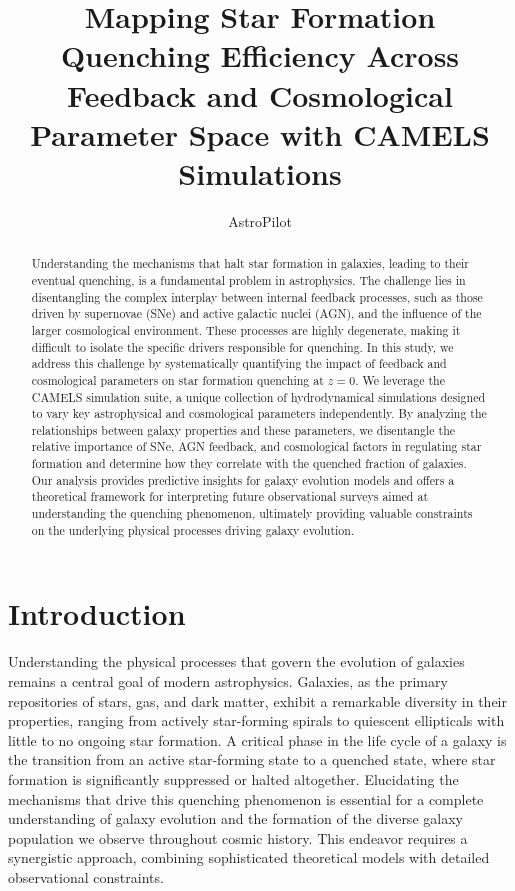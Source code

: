 \documentclass[twocolumn]{aastex631}
\begin{document}
\title{Mapping Star Formation Quenching Efficiency Across Feedback and Cosmological Parameter Space with CAMELS Simulations}

\author{AstroPilot}

\begin{abstract}
Understanding the mechanisms that halt star formation in galaxies, leading to their eventual quenching, is a fundamental problem in astrophysics. The challenge lies in disentangling the complex interplay between internal feedback processes, such as those driven by supernovae (SNe) and active galactic nuclei (AGN), and the influence of the larger cosmological environment. These processes are highly degenerate, making it difficult to isolate the specific drivers responsible for quenching. In this study, we address this challenge by systematically quantifying the impact of feedback and cosmological parameters on star formation quenching at $z=0$. We leverage the CAMELS simulation suite, a unique collection of hydrodynamical simulations designed to vary key astrophysical and cosmological parameters independently. By analyzing the relationships between galaxy properties and these parameters, we disentangle the relative importance of SNe, AGN feedback, and cosmological factors in regulating star formation and determine how they correlate with the quenched fraction of galaxies. Our analysis provides predictive insights for galaxy evolution models and offers a theoretical framework for interpreting future observational surveys aimed at understanding the quenching phenomenon, ultimately providing valuable constraints on the underlying physical processes driving galaxy evolution.
\end{abstract}



\section{Introduction}
\label{sec:intro}
Understanding the physical processes that govern the evolution of galaxies remains a central goal of modern astrophysics. Galaxies, as the primary repositories of stars, gas, and dark matter, exhibit a remarkable diversity in their properties, ranging from actively star-forming spirals to quiescent ellipticals with little to no ongoing star formation. A critical phase in the life cycle of a galaxy is the transition from an active star-forming state to a quenched state, where star formation is significantly suppressed or halted altogether. Elucidating the mechanisms that drive this quenching phenomenon is essential for a complete understanding of galaxy evolution and the formation of the diverse galaxy population we observe throughout cosmic history. This endeavor requires a synergistic approach, combining sophisticated theoretical models with detailed observational constraints.
\end{document}
